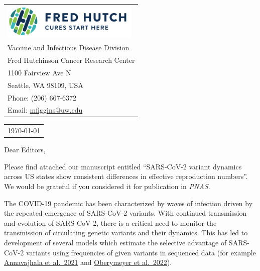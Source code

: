 \documentclass[11pt]{article}
\begin{document}
\thispagestyle{empty} %

\mbox{}\hfill
\begin{tabular}{l @{}}
	\includegraphics[width=6.5cm]{figures/fhcrc_logo} \\
	Vaccine and Infectious Disease Division \\
	Fred Hutchinson Cancer Research Center \\
	1100 Fairview Ave N \\
	Seattle, WA 98109, USA \\
	Phone: (206) 667-6372 \\
	Email: \href{mailto:mfiggins@uw.edu}{mfiggins@uw.edu} \\
\end{tabular}

\vspace{0.1in} %

\begin{tabular}{@{} l}
  \today
\end{tabular}

\vspace{0.1in} %

Dear Editors,

\medskip %

Please find attached our manuscript entitled ``SARS-CoV-2 variant dynamics across US states show consistent differences in effective reproduction numbers''.
We would be grateful if you considered it for publication in \textit{PNAS}.

The COVID-19 pandemic has been characterized by waves of infection driven by the repeated emergence of SARS-CoV-2 variants.
With continued transmission and evolution of SARS-CoV-2, there is a critical need to monitor the transmission of circulating genetic variants and their dynamics.
This has led to development of several models which estimate the selective advantage of SARS-CoV-2 variants using frequencies of given variants in sequenced data (for example \href{https://www.nature.com/articles/s41586-021-03908-2}{Annavajhala et al.\ 2021} and \href{https://www.science.org/doi/10.1126/science.abm1208}{Oberymeyer et al.\ 2022}).
\end{document}
